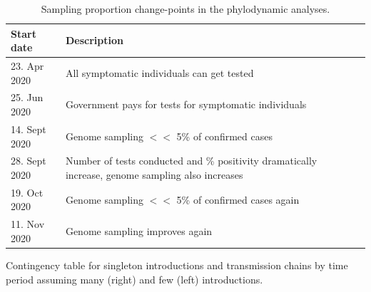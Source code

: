 \documentclass[9pt,twoside,lineno]{pnas-new}
\begin{document}
\newpage
\begin{table}[H]
\centering
\caption{Sampling proportion change-points in the phylodynamic analyses.}
\begin{tabular}{lp{6cm}rr}
Start date & Description \\
\midrule
23. Apr 2020 & All symptomatic individuals can get tested \\
25. Jun 2020 & Government pays for tests for symptomatic individuals \\
14. Sept 2020 & Genome sampling $<<$ 5\% of confirmed cases \\
28. Sept 2020 & Number of tests conducted and \% positivity dramatically increase, genome sampling also increases \\
19. Oct 2020 & Genome sampling $<<$ 5\% of confirmed cases again \\
11. Nov 2020 & Genome sampling improves again \\
\bottomrule
\end{tabular}
\end{table}

\newpage
\begin{table}[H]
\caption{Contingency table for singleton introductions and transmission chains by time period assuming many (right) and few (left)  introductions.}


\label{tab:lockdown-contingency}
\end{table}

\newpage









\end{document}
